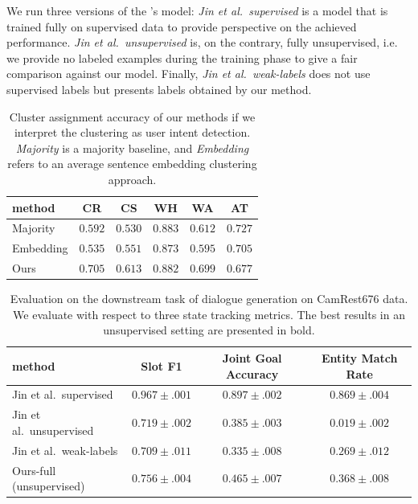 We run three versions of the \citet{jin2018explicit}'s model: \emph{Jin et al.\ supervised} is a model that is trained fully on supervised data to provide perspective on the achieved performance.
\emph{Jin et al.\ unsupervised} is, on the contrary, fully unsupervised, i.e. we provide no labeled examples during the training phase to give a fair comparison against our model.
Finally, \emph{Jin et al.\ weak-labels} does not use supervised labels but presents labels obtained by our method.
\begin{table}[]
    \centering
    \small
    \begin{tabular}{lccccc}
    \hline
     \textbf{method} & \textbf{CR} & \textbf{CS} & \textbf{WH} & \textbf{WA} & \textbf{AT} \\
     \hline
     Majority & $0.592$ & $0.530$ & $0.883$ & $0.612$ & $\pmb{0.727}$ \\
     Embedding & $0.535$ & $0.551$ & $0.873$ & $0.595$ & $0.705$ \\
     Ours & $\pmb{0.705}$ & $\pmb{0.613}$ & $\pmb{0.882}$ & $\pmb{0.699}$ & $0.677$ \\
     \hline
    \end{tabular}
    
    \caption{Cluster assignment accuracy of our methods if we interpret the clustering as user intent detection. \textit{Majority} is a majority baseline, and \textit{Embedding} refers to an average sentence embedding clustering approach.
    }
    \label{table:intentclust}
\end{table}

\begin{table}[tp]
    \centering
    \smaller
    \begin{tabular}{l|c|c|c}
    \hline
      \textbf{method} & \textbf{Slot F1} & \textbf{Joint Goal Accuracy} & \textbf{Entity Match Rate} \\
      \hline
        Jin et al.\ supervised & $0.967 \pm .001$ & $0.897 \pm .002$ & $0.869 \pm .004$ \\
        Jin et al.\ unsupervised & $0.719 \pm .002$ & $0.385 \pm .003$ & $0.019 \pm .002$ \\
        Jin et al.\ weak-labels & $0.709 \pm .011$ & $0.335 \pm .008$ & $0.269 \pm .012$ \\\hdashline[0.5pt/2pt]
        Ours-full (unsupervised) & $\pmb{0.756} \pm .004$ & $\pmb{0.465} \pm .007$ & $\pmb{0.368} \pm .008$ \\
     \hline
    \end{tabular}
    \caption{Evaluation on the downstream task of dialogue generation on CamRest676 data. We evaluate with respect to three state tracking metrics. The best results in an unsupervised setting are presented in bold.}
    \label{table:downstream}
\end{table}

